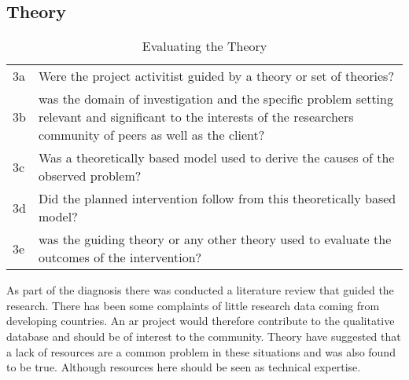 \subsection{Theory}
\begin{table}
\centering
\begin{tabular}{p{2cm} p{8cm}}
\hline
3a & Were the project activitist guided by a theory or set of theories? \\
3b & was the domain of investigation and the specific problem setting relevant and significant to the interests of the researchers community of peers as well as the client? \\
3c & Was a theoretically based model used to derive the causes of the observed problem? \\
3d & Did the planned intervention follow from this theoretically based model? \\
3e & was the guiding theory or any other theory used to evaluate the outcomes of the intervention? \\
\hline
\end{tabular}
\caption{Evaluating the Theory}
\label{tab:evath}
\end{table}
As part of the diagnosis there was conducted a literature review that guided the research.
There has been some complaints of little research data coming from developing countries.
An \gls{ar} project would therefore contribute to the qualitative database and should be of interest to the community.
Theory have suggested that a lack of resources are a common problem in these situations and was also found to be true.
Although resources here should be seen as technical expertise.


